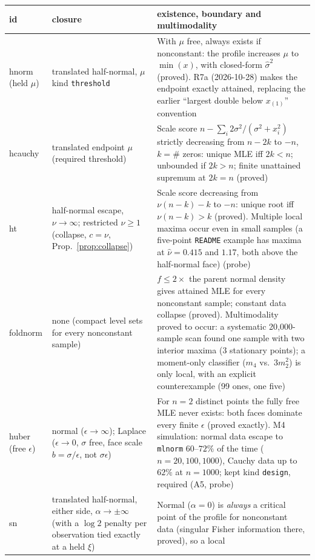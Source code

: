 \documentclass[11pt]{article}
\newcommand{\code}[1]{\texttt{#1}}
\theoremstyle{plain}
\theoremstyle{definition}
\theoremstyle{remark}
\begin{document}
\begin{center}
\small
\begin{tabular}{@{}l p{4.2cm} p{8.2cm}@{}}
\toprule
id & closure & existence, boundary and multimodality \\
\midrule
hnorm (held $\mu$) & translated half-normal, $\mu$ kind \code{threshold} &
  With $\mu$ free, always exists if nonconstant: the profile increases
  $\mu$ to $\min(x)$, with closed-form $\hat\sigma^2$ (proved). R7a
  (2026-10-28) makes the endpoint exactly attained, replacing the earlier
  ``largest double below $x_{(1)}$'' convention \\
hcauchy & translated endpoint $\mu$ (required threshold) &
  Scale score $n-\sum_i 2\sigma^2/(\sigma^2+x_i^2)$ strictly decreasing from
  $n-2k$ to $-n$, $k=\#$ zeros: unique MLE iff $2k<n$; unbounded if $2k>n$;
  finite unattained supremum at $2k=n$ (proved) \\
ht & half-normal escape, $\nu\to\infty$; restricted $\nu\ge1$ (collapse,
  $c=\nu$, Prop.~\ref{prop:collapse}) &
  Scale score decreasing from $\nu(n-k)-k$ to $-n$: unique root iff
  $\nu(n-k)>k$ (proved). Multiple local maxima occur even in small samples
  (a five-point \code{README} example has maxima at $\hat\nu=0.415$ and
  $1.17$, both above the half-normal face) (probe) \\
foldnorm & none (compact level sets for every nonconstant sample) &
  $f\le2\times$ the parent normal density gives attained MLE for every
  nonconstant sample; constant data collapse (proved). Multimodality proved
  to occur: a systematic 20{,}000-sample scan found one sample with two
  interior maxima (3 stationary points); a moment-only classifier
  ($m_4$ vs.\ $3m_2^2$) is only local, with an explicit counterexample
  (99 ones, one five) \\
huber (free $\epsilon$) & normal ($\epsilon\to\infty$); Laplace
  ($\epsilon\to0$, $\sigma$ free, face scale $b=\sigma/\epsilon$, not
  $\sigma\epsilon$) &
  For $n=2$ distinct points the fully free MLE never exists: both faces
  dominate every finite $\epsilon$ (proved exactly). M4 simulation: normal
  data escape to \code{mlnorm} $60$--$72\%$ of the time
  ($n=20,100,1000$), Cauchy data up to $62\%$ at $n=1000$; kept kind
  \code{design}, required (A5, probe) \\
sn & translated half-normal, either side, $\alpha\to\pm\infty$ (with a
  $\log2$ penalty per observation tied exactly at a held $\xi$) &
  Normal ($\alpha=0$) is \emph{always} a critical point of the profile for
  nonconstant data (singular Fisher information there, proved), so a local

\end{tabular}
\end{center}
\end{document}
